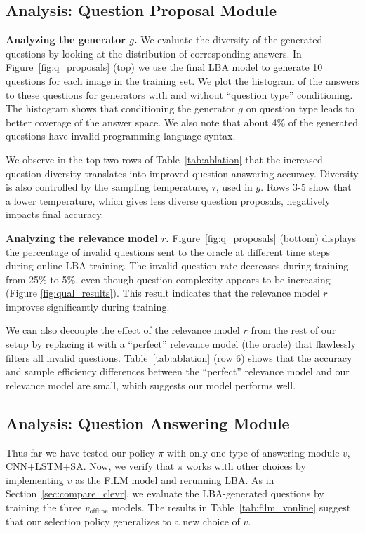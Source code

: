 \documentclass[10pt,twocolumn,letterpaper]{article}
\newcommand{\voffline}{v_{\mathrm{offline}}}
\begin{document}
\vspace{-0.05in}
\subsection{Analysis: Question Proposal Module}
\vspace{-0.05in}
\par \noindent \textbf{Analyzing the generator $g$.}
We evaluate the diversity of the generated questions by looking at the distribution of corresponding answers. In Figure~\ref{fig:q_proposals} (top) we use the final LBA model to generate 10 questions for each image in the training set. We plot the histogram of the answers to these questions for generators with and without ``question type'' conditioning. The histogram shows that conditioning the generator $g$ on question type leads to better coverage of the answer space. We also note that about 4\% of the generated questions have invalid programming language syntax.

We observe in the top two rows of Table~\ref{tab:ablation} that the increased question diversity translates into improved question-answering accuracy. Diversity is also controlled by the sampling temperature, $\tau$, used in $g$. Rows 3-5 show that a lower temperature, which gives less diverse question proposals, negatively impacts final accuracy.

\par \noindent \textbf{Analyzing the relevance model $r$.} Figure~\ref{fig:q_proposals} (bottom) displays the percentage of invalid questions sent to the oracle at different time steps during online LBA training. The invalid question rate decreases during training from 25\% to 5\%, even though question complexity appears to be increasing (Figure \ref{fig:qual_results}). This result indicates that the relevance model $r$ improves significantly during training.

We can also decouple the effect of the relevance model $r$ from the rest of our setup by replacing it with a ``perfect'' relevance model (the oracle) that flawlessly filters all invalid questions. Table~\ref{tab:ablation} (row 6) shows that the accuracy and sample efficiency differences between the ``perfect'' relevance model and our relevance model are small, which suggests our model performs well.
\vspace{-0.05in}
\subsection{Analysis: Question Answering Module}
\vspace{-0.05in}
Thus far we have tested our policy $\pi$ with only one type of answering module $v$,  CNN+LSTM+SA. Now, we verify that $\pi$ works with other choices by implementing $v$ as the FiLM model and rerunning LBA. As in Section~\ref{sec:compare_clevr}, we evaluate the LBA-generated questions by training the three $\voffline$ models. The results in Table~\ref{tab:film_vonline} suggest that our selection policy generalizes to a new choice of $v$.
\end{document}
